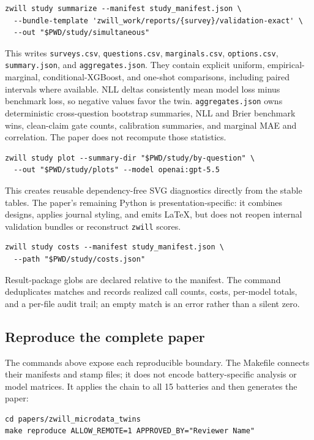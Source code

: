 \documentclass[11pt]{article}
\newcommand{\zwill}{\texttt{zwill}}
\begin{document}
\begin{lstlisting}[style=shell]
zwill study summarize --manifest study_manifest.json \
  --bundle-template 'zwill_work/reports/{survey}/validation-exact' \
  --out "$PWD/study/simultaneous"
\end{lstlisting}
This writes \texttt{surveys.csv}, \texttt{questions.csv},
\texttt{marginals.csv}, \texttt{options.csv}, \texttt{summary.json}, and
\texttt{aggregates.json}. They
contain explicit uniform, empirical-marginal, conditional-XGBoost, and one-shot
comparisons, including paired intervals where available. NLL deltas consistently
mean model loss minus benchmark loss, so negative values favor the twin.
\texttt{aggregates.json} owns deterministic cross-question bootstrap summaries,
NLL and Brier benchmark wins, clean-claim gate counts, calibration summaries,
and marginal MAE and correlation. The paper does not recompute those statistics.

\begin{lstlisting}[style=shell]
zwill study plot --summary-dir "$PWD/study/by-question" \
  --out "$PWD/study/plots" --model openai:gpt-5.5
\end{lstlisting}
This creates reusable dependency-free SVG diagnostics directly from the stable
tables. The paper's remaining Python is presentation-specific: it combines
designs, applies journal styling, and emits LaTeX, but does not reopen internal
validation bundles or reconstruct \zwill{} scores.

\begin{lstlisting}[style=shell]
zwill study costs --manifest study_manifest.json \
  --path "$PWD/study/costs.json"
\end{lstlisting}
Result-package globs are declared relative to the manifest. The command
deduplicates matches and records realized call counts, costs, per-model totals,
and a per-file audit trail; an empty match is an error rather than a silent zero.

\subsection{Reproduce the complete paper}
The commands above expose each reproducible boundary. The Makefile connects
their manifests and stamp files; it does not encode battery-specific analysis
or model matrices. It applies the chain to all 15 batteries and then generates
the paper:

\begin{lstlisting}[style=shell]
cd papers/zwill_microdata_twins
make reproduce ALLOW_REMOTE=1 APPROVED_BY="Reviewer Name"
\end{lstlisting}
\end{document}
